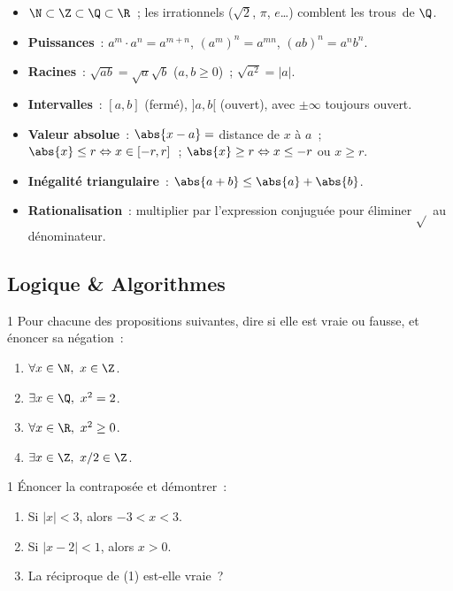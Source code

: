 \begin{bilan}
\begin{itemize}
  \item $\N \subset \Z \subset \Q \subset \R$~; les irrationnels
        ($\sqrt{2}$, $\pi$, $e$\ldots) comblent les \og trous\fg\ de $\Q$.
  \item \textbf{Puissances}~: $a^m\cdot a^n = a^{m+n}$,\;
        $(a^m)^n = a^{mn}$,\; $(ab)^n = a^nb^n$.
  \item \textbf{Racines}~: $\sqrt{ab}=\sqrt{a}\sqrt{b}$ ($a,b\geq0$)~;
        $\sqrt{a^2}=|a|$.
  \item \textbf{Intervalles}~: $[a,b]$ (ferm\'e), $]a,b[$ (ouvert),
        avec $\pm\infty$ toujours ouvert.
  \item \textbf{Valeur absolue}~: $\abs{x-a}=$ distance de $x$ \`a $a$~;
        $\abs{x}\leq r \Leftrightarrow x\in[-r,r]$~;
        $\abs{x}\geq r \Leftrightarrow x\leq-r$ ou $x\geq r$.
  \item \textbf{In\'egalit\'e triangulaire}~:
        $\abs{a+b}\leq\abs{a}+\abs{b}$.
  \item \textbf{Rationalisation}~:
        multiplier par l'expression conjugu\'ee pour \'eliminer $\sqrt{}$
        au d\'enominateur.
\end{itemize}
\end{bilan}

\subsection*{Logique \& Algorithmes}

\begin{exo}{1}
Pour chacune des propositions suivantes, dire si elle est vraie ou fausse,
et \'enoncer sa n\'egation~:
\begin{enumerate}
  \item $\forall x\in\N,\ x\in\Z$.\quad
  \item $\exists x\in\Q,\ x^2=2$.\quad
  \item $\forall x\in\R,\ x^2\geq0$.\quad
  \item $\exists x\in\Z,\ x/2\in\Z$.
\end{enumerate}
\end{exo}

\begin{exo}{1}
\'Enoncer la contrapos\'ee et d\'emontrer~:
\begin{enumerate}
  \item \og Si $|x|<3$, alors $-3<x<3$.\fg
  \item \og Si $|x-2|<1$, alors $x>0$.\fg
  \item La r\'eciproque de (1) est-elle vraie~?
\end{enumerate}
\end{exo}

